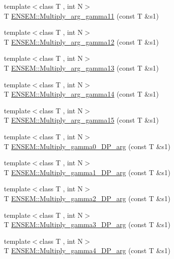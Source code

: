 \begin{DoxyCompactItemize}
\item 
{\footnotesize template$<$class T , int N$>$ }\\T \mbox{\hyperlink{namespaceENSEM_af82943ccca99d10c6f938ed0bf602a6c}{E\+N\+S\+E\+M\+::\+Multiply\+\_\+arg\+\_\+gamma11}} (const T \&s1)
\item 
{\footnotesize template$<$class T , int N$>$ }\\T \mbox{\hyperlink{namespaceENSEM_ad87f605b2c52a2e2163988dd6a162c6c}{E\+N\+S\+E\+M\+::\+Multiply\+\_\+arg\+\_\+gamma12}} (const T \&s1)
\item 
{\footnotesize template$<$class T , int N$>$ }\\T \mbox{\hyperlink{namespaceENSEM_a896031e37c4b82dc0dbce775f3a13202}{E\+N\+S\+E\+M\+::\+Multiply\+\_\+arg\+\_\+gamma13}} (const T \&s1)
\item 
{\footnotesize template$<$class T , int N$>$ }\\T \mbox{\hyperlink{namespaceENSEM_af623aded659b9d054073eda60b56ab49}{E\+N\+S\+E\+M\+::\+Multiply\+\_\+arg\+\_\+gamma14}} (const T \&s1)
\item 
{\footnotesize template$<$class T , int N$>$ }\\T \mbox{\hyperlink{namespaceENSEM_ad1bfb7d1fc1c7b777e7e1d92accbc1b7}{E\+N\+S\+E\+M\+::\+Multiply\+\_\+arg\+\_\+gamma15}} (const T \&s1)
\item 
{\footnotesize template$<$class T , int N$>$ }\\T \mbox{\hyperlink{namespaceENSEM_a70979a2e217f7ceece8d9505057fc050}{E\+N\+S\+E\+M\+::\+Multiply\+\_\+gamma0\+\_\+\+D\+P\+\_\+arg}} (const T \&s1)
\item 
{\footnotesize template$<$class T , int N$>$ }\\T \mbox{\hyperlink{namespaceENSEM_aa25e619806d7f439f5adb3d1102d28d0}{E\+N\+S\+E\+M\+::\+Multiply\+\_\+gamma1\+\_\+\+D\+P\+\_\+arg}} (const T \&s1)
\item 
{\footnotesize template$<$class T , int N$>$ }\\T \mbox{\hyperlink{namespaceENSEM_af33b985b43c584e03ac68fe4ff39078c}{E\+N\+S\+E\+M\+::\+Multiply\+\_\+gamma2\+\_\+\+D\+P\+\_\+arg}} (const T \&s1)
\item 
{\footnotesize template$<$class T , int N$>$ }\\T \mbox{\hyperlink{namespaceENSEM_adac24f5430c26eab09779f3718806256}{E\+N\+S\+E\+M\+::\+Multiply\+\_\+gamma3\+\_\+\+D\+P\+\_\+arg}} (const T \&s1)
\item 
{\footnotesize template$<$class T , int N$>$ }\\T \mbox{\hyperlink{namespaceENSEM_a0026955723cecd4a7e2efd8d4f2056b5}{E\+N\+S\+E\+M\+::\+Multiply\+\_\+gamma4\+\_\+\+D\+P\+\_\+arg}} (const T \&s1)

\end{DoxyCompactItemize}
